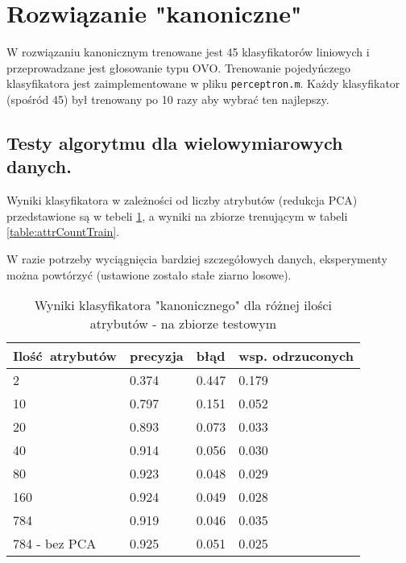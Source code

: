 \documentclass[a4paper]{article}
\begin{document}
\section{Rozwiązanie "kanoniczne"}
\label{canonical}

W rozwiązaniu kanonicznym trenowane jest 45 klasyfikatorów liniowych
i przeprowadzane jest głosowanie typu OVO.
Trenowanie pojedyńczego klasyfikatora jest zaimplementowane w pliku \texttt{perceptron.m}.
Każdy klasyfikator (spośród 45) był trenowany po 10 razy aby wybrać ten najlepszy.

\subsection{Testy algorytmu dla wielowymiarowych danych.}
Wyniki klasyfikatora w zależności od liczby atrybutów (redukcja PCA) przedstawione są w tebeli \ref{table:attrCount},
a wyniki na zbiorze trenującym w tabeli \ref{table:attrCountTrain}.

W razie potrzeby wyciągnięcia bardziej szczegółowych danych,
eksperymenty można powtórzyć (ustawione zostało stałe ziarno losowe).

\begin{table}[H]
    \caption{Wyniki klasyfikatora "kanonicznego" dla różnej ilości atrybutów - na zbiorze testowym
    \label{table:attrCount}
    }
\begin{center}
    \begin{tabular}{| l | l | l | l |}
    \hline
        Ilość atrybutów & precyzja & błąd & wsp. odrzuconych \\
    \hline
        2  & 0.374 & 0.447 & 0.179 \\
        10 & 0.797 & 0.151 & 0.052 \\
        20 & 0.893 & 0.073 & 0.033 \\
        40 & 0.914 & 0.056 & 0.030 \\
        80 & 0.923 & 0.048 & 0.029 \\
        160& 0.924 & 0.049 & 0.028 \\
        784& 0.919 & 0.046 & 0.035 \\
        784 - bez PCA & 0.925 & 0.051 & 0.025 \\
    \hline
    \end{tabular}
\end{center}
\end{table}
\end{document}
